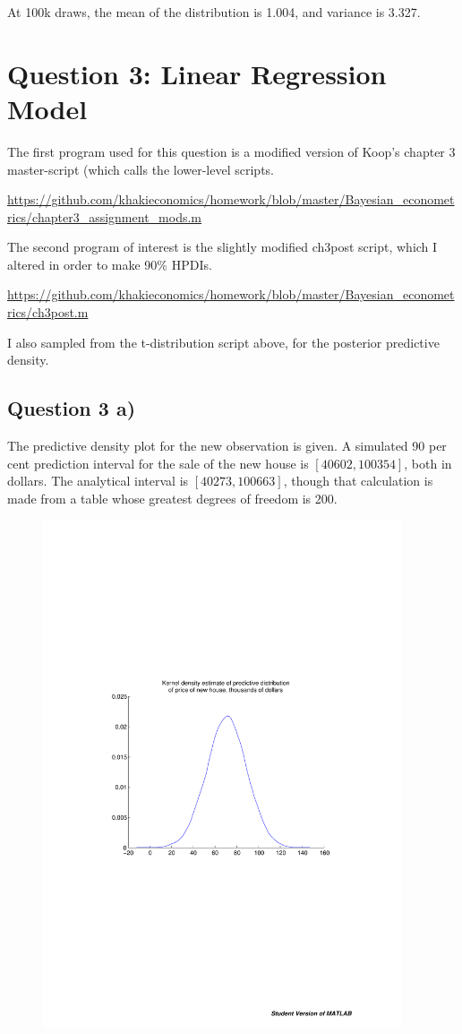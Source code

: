 \documentclass[a4paper,11pt]{article}
\begin{document}
At 100k draws, the mean of the distribution is 1.004, and variance is 3.327.


\section*{Question 3: Linear Regression Model}

The first program used for this question is a modified version of Koop's chapter 3 master-script (which calls the lower-level scripts. 

\url{https://github.com/khakieconomics/homework/blob/master/Bayesian_econometrics/chapter3_assignment_mods.m}


The second program of interest is the slightly modified ch3post script, which I altered in order to make 90\% HPDIs.

\url{https://github.com/khakieconomics/homework/blob/master/Bayesian_econometrics/ch3post.m}

I also sampled from the t-distribution script above, for the posterior predictive density. 
\subsection*{Question 3 a)}

The predictive density plot for the new observation is given. A simulated 90 per cent prediction interval for the sale of the new house is $[40602, 100354]$, both in dollars. The analytical interval is $[40273, 100663]$, though that calculation is made from a table whose greatest degrees of freedom is 200.

\begin{figure}
  \centering
  \includegraphics[width=300pt]{predictive_density.pdf}\\
  \label{preddensity}
\end{figure}
\end{document}
